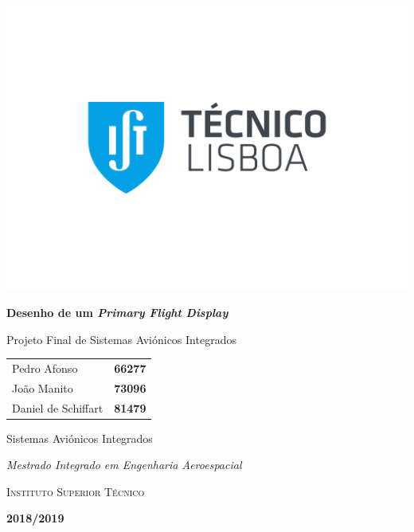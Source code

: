 \documentclass[palatino]{ist-report}
\begin{document}
\begin{titlepage}

\begin{center}
	\vspace*{0.05\textheight}
	\includegraphics[width = 0.4\linewidth, trim = {172.4pt 202.7pt 172.6pt 201.4pt}, clip]{IST_A_CMYK_POS}
	
	\vspace*{0.1\textheight}
	{\huge\bfseries Desenho de um \textit{Primary Flight Display}}
	
	\vspace*{0.03\textheight}
	{\Large Projeto Final de Sistemas Aviónicos Integrados}
	
	\vspace{\fill}
	{\Large \begin{tabular}{l r} Pedro Afonso & \textbf{66277} \\ João Manito & \textbf{73096} \\ Daniel de Schiffart & \textbf{81479}\end{tabular}}
	
	\vspace*{30mm}
	{\large Sistemas Aviónicos Integrados}
	
	\vspace*{0.005\textheight}
	{\Large\itshape Mestrado Integrado em Engenharia Aeroespacial}
	
	\vspace*{0.005\textheight}
	{\large\scshape Instituto Superior Técnico}
	
	\vspace*{0.6cm}
	{\large\bfseries 2018/2019}
\end{center}

\end{titlepage}
\setcounter{page}{1}

\begin{abstract}
    Neste projeto final da unidade curricular de Sistemas Aviónicos Integrados foi desenhado e simulado um \textit{Primary Flight Display} para processar um conjunto de dados de uma simulação de voo em tempo real e simular o comportamento de um verdadeiro \textit{Primary Flight Display} durante o voo simulado.
    
    O \textit{Primary Flight Display} foi desenhado em C com recurso à API OpenGL e à biblioteca gráfica SDL para criar a interface gráfica.
\end{abstract}
\end{document}
